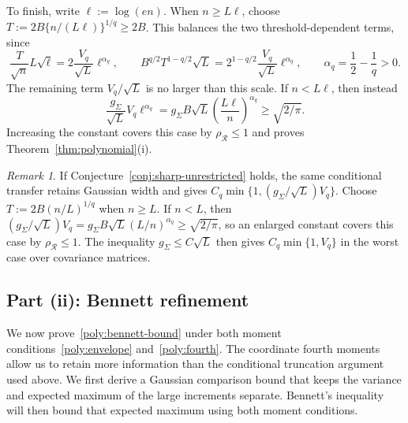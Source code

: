 \documentclass[11pt,letterpaper]{article}
\theoremstyle{remark}
\newtheorem{remark}{Remark}
\newcommand{\rh}{\rho_{\mathcal R}}
\begin{document}
To finish, write $\ell:=\log(en)$. When $n\ge L\ell$, choose
$T:=2B\{n/(L\ell)\}^{1/q}\ge2B$. This balances the two
threshold-dependent terms, since
\[
 \frac{T}{\sqrt n}L\sqrt\ell
   =2\frac{V_q}{\sqrt L}\ell^{\alpha_q},\qquad
 B^{q/2}T^{1-q/2}\sqrt L
   =2^{1-q/2}\frac{V_q}{\sqrt L}\ell^{\alpha_q},
 \qquad \alpha_q=\frac12-\frac1q>0.
\]
The remaining term $V_q/\sqrt L$ is no larger than this scale.
If $n<L\ell$, then instead
\[
 \frac{g_\Sigma}{\sqrt L}V_q\ell^{\alpha_q}
 =g_\Sigma B\sqrt L\left(\frac{L\ell}{n}\right)^{\alpha_q}
 \ge\sqrt{2/\pi}.
\]
Increasing the constant covers this case by $\rh\le1$ and proves
Theorem~\ref{thm:polynomial}\textup{(i)}.

\begin{remark}\label{rmk:E1}
If Conjecture~\ref{conj:sharp-unrestricted} holds, the same
conditional transfer retains Gaussian width and gives
$C_q\min\{1,(g_\Sigma/\sqrt L)V_q\}$. Choose
$T:=2B(n/L)^{1/q}$ when $n\ge L$. If $n<L$, then
$(g_\Sigma/\sqrt L)V_q
=g_\Sigma B\sqrt L(L/n)^{\alpha_q}\ge\sqrt{2/\pi}$,
so an enlarged constant covers this case by $\rh\le1$.
The inequality $g_\Sigma\le C\sqrt L$ then gives
$C_q\min\{1,V_q\}$ in the worst case over covariance matrices.
\end{remark}

\subsection{\texorpdfstring{{Part (ii): Bennett refinement}}{Part (ii): Bennett refinement}}\label{app:bennett}

We now prove~\eqref{poly:bennett-bound} under both moment
conditions~\eqref{poly:envelope} and~\eqref{poly:fourth}. The
coordinate fourth moments allow us to retain more information than
the conditional truncation argument used above. We first derive a
Gaussian comparison bound that keeps the variance and expected
maximum of the large increments separate. Bennett's inequality
will then bound that expected maximum using both moment conditions.
\end{document}
